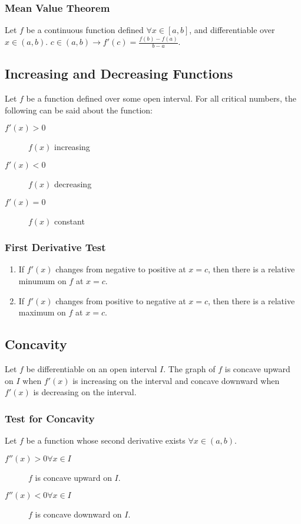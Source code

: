 \subsubsection{Mean Value Theorem}
Let $f$ be a continuous function defined $\forall{x}\in [a,b]$, and
differentiable over $x\in(a,b)$. $c\in(a,b)\to f'(c)=\frac{f(b)-f(a)}{b-a}$.

\subsection{Increasing and Decreasing Functions}
Let $f$ be a function defined over some open interval. For all critical numbers,
the following can be said about the function:
\begin{description}
  \item[$f'(x)>0$] $f(x)$ increasing
  \item[$f'(x)<0$] $f(x)$ decreasing
  \item[$f'(x)=0$] $f(x)$ constant
\end{description}

\subsubsection{First Derivative Test}
\begin{enumerate}
  \item If $f'(x)$ changes from negative to positive at $x=c$, then there is a
    relative minumum on $f$ at $x=c$.
  \item If $f'(x)$ changes from positive to negative at $x=c$, then there is a
    relative maximum on $f$ at $x=c$.
\end{enumerate}

\subsection{Concavity}
Let $f$ be differentiable on an open interval $I$. The graph of $f$ is concave
upward on $I$ when $f'(x)$ is increasing on the interval and concave downward
when $f'(x)$ is decreasing on the interval.

\subsubsection{Test for Concavity}
Let $f$ be a function whose second derivative exists $\forall{x}\in(a,b)$.
\begin{description}
  \item[$f''(x)>0\forall{x}\in{I}$] $f$ is concave upward on $I$.
  \item[$f''(x)<0\forall{x}\in{I}$] $f$ is concave downward on $I$.
\end{description}

